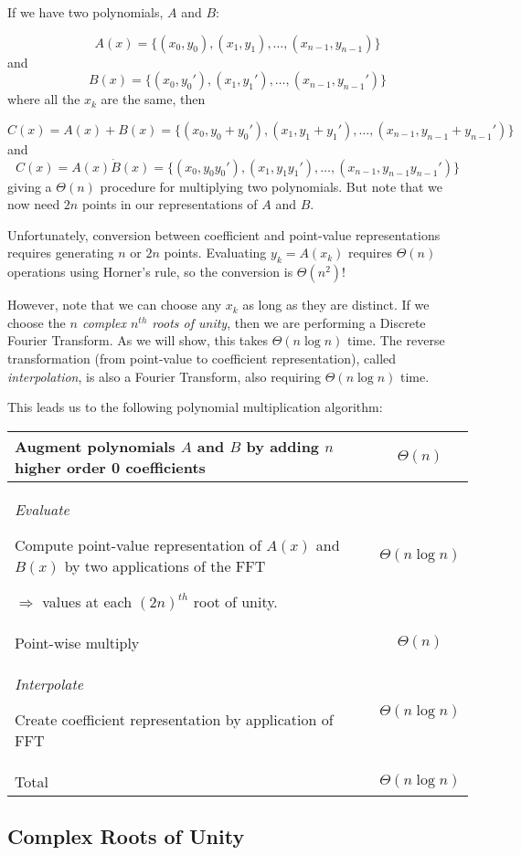 If we have two polynomials, $A$ and $B$:

\[ A(x) = \{ (x_0,y_0), (x_1,y_1), \ldots , (x_{n-1},y_{n-1}) \} \]
and
\[ B(x) = \{ (x_0,y_0'), (x_1,y_1'), \ldots , (x_{n-1},y_{n-1}') \} \]
where all the $x_k$ are the same,
then

\[ C(x) = A(x)+ B(x) = \{ (x_0,y_0+y_0'), (x_1,y_1+y_1'), \ldots , (x_{n-1},y_{n-1}+y_{n-1}') \} \]
and
\[ C(x) = A(x)\dot B(x) = \{ (x_0,y_0y_0'), (x_1,y_1y_1'), \ldots , (x_{n-1},y_{n-1}y_{n-1}') \} \]
giving a $\Theta(n)$ procedure for multiplying two polynomials.
But note that we now need $2n$ points in our representations of $A$
and $B$.

Unfortunately, conversion between coefficient and point-value
representations requires generating $n$ or $2n$ points.
Evaluating $y_k = A(x_k)$ requires $\Theta(n)$ operations 
using Horner's rule,
so the conversion is $\Theta(n^2)$!

However, note that we can choose any $x_k$ as long as they are 
distinct.
If we choose the {\em $n$ complex $n^{th}$ roots of unity},
then we are performing a Discrete Fourier Transform.
As we will show, this takes $\Theta(n\log{n})$ time.
The reverse transformation 
(from point-value to coefficient representation),
called {\it interpolation}, is also a Fourier Transform,
also requiring $\Theta(n\log{n})$ time.

This leads us to the following polynomial multiplication
algorithm:

\begin{tabular}{|p{9cm}|c|}
\hline
Augment polynomials $A$ and $B$
by adding $n$ higher order 0 coefficients & $\Theta(n)$ \\
\hline
{\em Evaluate}

Compute point-value representation of $A(x)$ and $B(x)$
by two applications of the FFT

$\Rightarrow$ values at each $(2n)^{th}$ root of unity. & $\Theta(n\log{n})$ \\
\hline

Point-wise multiply & $\Theta(n)$ \\
\hline

{\em Interpolate}

Create coefficient representation by application of FFT & $\Theta(n\log{n})$ \\
\hline
Total & $\Theta(n\log{n})$ \\
\hline
\end{tabular}

\subsection{Complex Roots of Unity}

